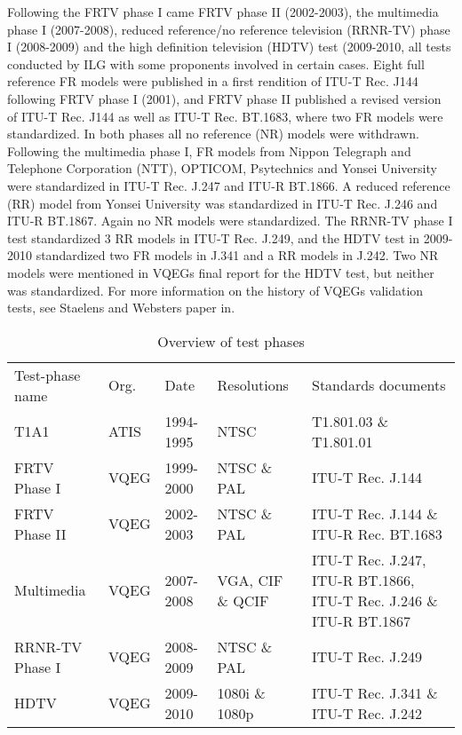 Following the FRTV phase I came FRTV phase II (2002-2003), the multimedia phase I (2007-2008), reduced reference/no reference television (RRNR-TV) phase I (2008-2009) and the high definition television (HDTV) test (2009-2010, all tests conducted by ILG with some proponents involved in certain cases. Eight full reference FR models were published in a first rendition of ITU-T Rec. J144 following FRTV phase I (2001), and FRTV phase II published a revised version of ITU-T Rec. J144 as well as ITU-T Rec. BT.1683, where two FR models were standardized. In both phases all no reference (NR) models were withdrawn. Following the multimedia phase I, FR models from Nippon Telegraph and Telephone Corporation (NTT), OPTICOM, Psytechnics and Yonsei University were standardized in ITU-T Rec. J.247 and ITU-R BT.1866. A reduced reference (RR) model from Yonsei University was standardized in ITU-T Rec. J.246 and ITU-R BT.1867. Again no NR models were standardized. The RRNR-TV phase I test standardized 3 RR models in ITU-T Rec. J.249, and the HDTV test in 2009-2010 standardized two FR models in J.341 and a RR models in J.242. Two NR models were mentioned in VQEGs final report for the HDTV test, but neither was standardized. For more information on the history of VQEGs validation tests, see Staelens and Websters paper in\cite{6659332}.

\begin{table}
	\center
	\caption{Overview of test phases}
    \begin{tabular}{p{3cm}p{1.5cm}p{2cm}p{3cm}p{5cm}}
    Test-phase name  & Org. & Date      & Resolutions      & Standards documents                                                \\
    T1A1            & ATIS & 1994-1995 & NTSC             & T1.801.03 \& T1.801.01                                             \\
    FRTV Phase I    & VQEG & 1999-2000 & NTSC \& PAL      & ITU-T Rec. J.144                                                   \\
    FRTV Phase II   & VQEG & 2002-2003 & NTSC \& PAL      & ITU-T Rec. J.144 \& ITU-R Rec. BT.1683                             \\
    Multimedia      & VQEG & 2007-2008 & VGA, CIF \& QCIF & ITU-T Rec. J.247, ITU-R BT.1866, ITU-T Rec. J.246 \& ITU-R BT.1867 \\
    RRNR-TV Phase I & VQEG & 2008-2009 & NTSC \& PAL      & ITU-T Rec. J.249                                                   \\
    HDTV            & VQEG & 2009-2010 & 1080i \& 1080p   & ITU-T Rec. J.341 \& ITU-T Rec. J.242                               \\
    \end{tabular}	
	\label{table:testOverview}
\end{table}


